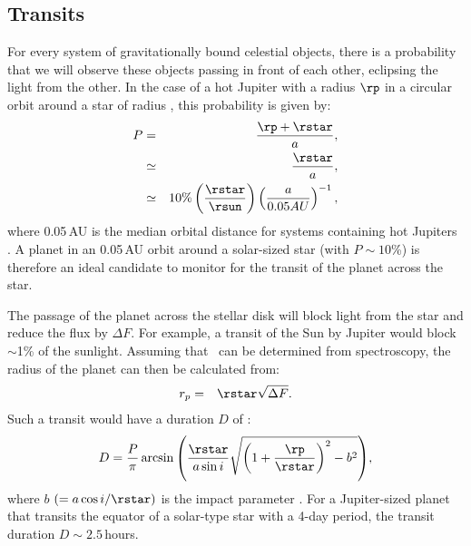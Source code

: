 \subsection{Transits}
\label{cha:intro:sec:methods:sub:trans}

For every system of gravitationally bound celestial objects, there is a probability that we will observe these objects passing in front of each other, eclipsing the light from the other.
In the case of a hot Jupiter with a radius $\rp$ in a circular orbit around a star of radius \rstar, this probability is given by:
\begin{eqnarray*}
P & = & \frac{\rp + \rstar}{a},\\
 & \simeq & \frac{\rstar}{a},\\
  & \simeq & 10\% \left( \frac{\rstar}{\rsun} \right) \left( \frac{a}{0.05 AU} \right)^{-1},
\end{eqnarray*}
where 0.05\,AU is the median orbital distance for systems containing hot Jupiters \citep{Sackett:POSS:1999a}.
A planet in an 0.05\,AU orbit around a solar-sized star (with $P\sim10$\%) is therefore an ideal candidate to monitor for the transit of the planet across the star.

The passage of the planet across the stellar disk will block light from the star and reduce the flux by $\Delta F$.
For example, a transit of the Sun by Jupiter would block $\sim$1\% of the sunlight.
Assuming that \rstar\ can be determined from spectroscopy, the radius of the planet can then be calculated from:
\begin{eqnarray*}
r_{p} & = & {\rstar} \sqrt{\Delta F}.
\end{eqnarray*}
Such a transit would have a duration $D$ of :
\begin{eqnarray*}
D = \frac{P}{\pi} \arcsin{\left( \frac{\rstar}{a \sin{i}}
\sqrt{\left(1+\frac{\rp}{\rstar}\right)^2 - b^2} \right)},
\end{eqnarray*}
where $b$ $(=a\cos{i}/\rstar)$ is the impact parameter \citep{Seager_Mallen-Ornelas:apj:2003a}.
For a Jupiter-sized planet that transits the equator of a solar-type star with a 4-day period, the transit duration $D\sim2.5$\,hours.

